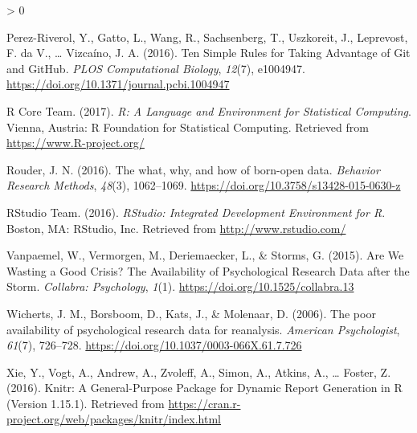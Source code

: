 \documentclass[
  american,
  ,doc,floatsintext]{apa6}
\newlength{\cslhangindent}
\newenvironment{CSLReferences}[2] %
 {%
  \setlength{\parindent}{0pt}
  \ifodd #1 \everypar{\setlength{\hangindent}{\cslhangindent}}\ignorespaces\fi
  \ifnum #2 > 0
  \setlength{\parskip}{#2\baselineskip}
  \fi
 }%
 {}
\begin{document}
\begin{CSLReferences}{1}{0}
\leavevmode\hypertarget{ref-perez-riverol_ten_2016}{}%
Perez-Riverol, Y., Gatto, L., Wang, R., Sachsenberg, T., Uszkoreit, J., Leprevost, F. da V., \ldots{} Vizcaíno, J. A. (2016). Ten {Simple Rules} for {Taking Advantage} of {Git} and {GitHub}. \emph{PLOS Computational Biology}, \emph{12}(7), e1004947. \url{https://doi.org/10.1371/journal.pcbi.1004947}

\leavevmode\hypertarget{ref-r_core_team_r:_2017}{}%
R Core Team. (2017). \emph{R: {A Language} and {Environment} for {Statistical Computing}}. {Vienna, Austria}: {R Foundation for Statistical Computing}. Retrieved from \url{https://www.R-project.org/}

\leavevmode\hypertarget{ref-rouder_what_2016}{}%
Rouder, J. N. (2016). The what, why, and how of born-open data. \emph{Behavior Research Methods}, \emph{48}(3), 1062--1069. \url{https://doi.org/10.3758/s13428-015-0630-z}

\leavevmode\hypertarget{ref-rstudio_team_rstudio:_2016}{}%
RStudio Team. (2016). \emph{{RStudio}: {Integrated Development Environment} for {R}}. {Boston, MA}: {RStudio, Inc.} Retrieved from \url{http://www.rstudio.com/}

\leavevmode\hypertarget{ref-vanpaemel_are_2015}{}%
Vanpaemel, W., Vermorgen, M., Deriemaecker, L., \& Storms, G. (2015). Are {We Wasting} a {Good Crisis}? {The Availability} of {Psychological Research Data} after the {Storm}. \emph{Collabra: Psychology}, \emph{1}(1). \url{https://doi.org/10.1525/collabra.13}

\leavevmode\hypertarget{ref-wicherts_poor_2006}{}%
Wicherts, J. M., Borsboom, D., Kats, J., \& Molenaar, D. (2006). The poor availability of psychological research data for reanalysis. \emph{American Psychologist}, \emph{61}(7), 726--728. \url{https://doi.org/10.1037/0003-066X.61.7.726}

\leavevmode\hypertarget{ref-xie_knitr:_2016}{}%
Xie, Y., Vogt, A., Andrew, A., Zvoleff, A., Simon, A., Atkins, A., \ldots{} Foster, Z. (2016). Knitr: {A General}-{Purpose Package} for {Dynamic Report Generation} in {R} (Version 1.15.1). Retrieved from \url{https://cran.r-project.org/web/packages/knitr/index.html}

\end{CSLReferences}
\end{document}
